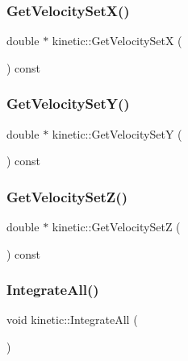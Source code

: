 \mbox{\label{classkinetic_ac19955de68dae320c6340259e8f8a700}} 
\subsubsection{\texorpdfstring{Get\+Velocity\+Set\+X()}{GetVelocitySetX()}}
{\footnotesize\ttfamily double $\ast$ kinetic\+::\+Get\+Velocity\+SetX (\begin{DoxyParamCaption}{ }\end{DoxyParamCaption}) const}

\mbox{\label{classkinetic_a2a7f9c38c1f9f6fac18ff121e1b2177e}} 
\subsubsection{\texorpdfstring{Get\+Velocity\+Set\+Y()}{GetVelocitySetY()}}
{\footnotesize\ttfamily double $\ast$ kinetic\+::\+Get\+Velocity\+SetY (\begin{DoxyParamCaption}{ }\end{DoxyParamCaption}) const}

\mbox{\label{classkinetic_a596368db571a795a6c3476f0ac0006bc}} 
\subsubsection{\texorpdfstring{Get\+Velocity\+Set\+Z()}{GetVelocitySetZ()}}
{\footnotesize\ttfamily double $\ast$ kinetic\+::\+Get\+Velocity\+SetZ (\begin{DoxyParamCaption}{ }\end{DoxyParamCaption}) const}

\mbox{\label{classkinetic_a76cf34444249efa97fb73f710cc924ad}} 
\subsubsection{\texorpdfstring{Integrate\+All()}{IntegrateAll()}}
{\footnotesize\ttfamily void kinetic\+::\+Integrate\+All (\begin{DoxyParamCaption}{ }\end{DoxyParamCaption})}




